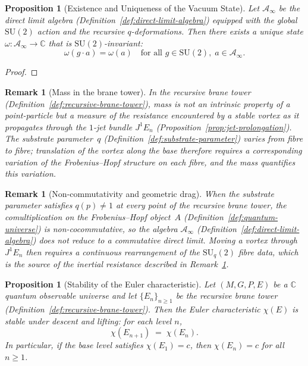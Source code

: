 \documentclass[12pt,a4paper]{report}
\newtheorem{proposition}[theorem]{Proposition}
\newtheorem{remark}[theorem]{Remark}
\begin{document}
\begin{proposition}[Existence and Uniqueness of the Vacuum State]
\label{prop:vacuum-state}
Let $\mathcal{A}_\infty$ be the direct limit algebra
(Definition~\ref{def:direct-limit-algebra}) equipped with the global
$\mathrm{SU}(2)$ action and the recursive $q$-deformations.  Then there exists
a unique state $\omega \colon \mathcal{A}_\infty \to \mathbb{C}$ that is
$\mathrm{SU}(2)$-invariant:
\[
  \omega(g \cdot a) = \omega(a)
  \quad\text{for all } g \in \mathrm{SU}(2),\;
  a \in \mathcal{A}_\infty.
\]
\end{proposition}

\begin{proof}
\end{proof}



\begin{remark}[Mass in the brane tower]
\label{rem:mass-geometric-drag}
In the recursive brane tower (Definition~\ref{def:recursive-brane-tower}),
mass is not an intrinsic property of a point-particle but a measure of the
resistance encountered by a stable vortex as it propagates through the
$1$-jet bundle $J^1 E_n$ (Proposition~\ref{prop:jet-prolongation}).  The
substrate parameter~$q$ (Definition~\ref{def:substrate-parameter}) varies from
fibre to fibre; translation of the vortex along the base therefore requires a
corresponding variation of the Frobenius--Hopf structure on each fibre, and
the mass quantifies this variation.
\end{remark}

\begin{remark}[Non-commutativity and geometric drag]
\label{rem:mass-noncommutative-drag}
When the substrate parameter satisfies $q(p) \neq 1$ at every point of the recursive brane tower, the comultiplication on the Frobenius--Hopf object~$A$
(Definition~\ref{def:quantum-universe}) is non-cocommutative, so the
algebra $\mathcal{A}_\infty$ (Definition~\ref{def:direct-limit-algebra})
does not reduce to a commutative direct limit.  Moving a vortex through
$J^1 E_n$ then requires a continuous rearrangement of the
$\mathrm{SU}_q(2)$ fibre data, which is the source of the inertial
resistance described in Remark~\ref{rem:mass-geometric-drag}.
\end{remark}

\begin{proposition}[Stability of the Euler characteristic]
\label{prop:euler-char-stability}
Let $(M, G, P, E)$ be a $\mathbb{C}$ quantum observable universe and let
$\{E_n\}_{n \geq 1}$ be the recursive brane tower
(Definition~\ref{def:recursive-brane-tower}).  Then the Euler characteristic
$\chi(E)$ is stable under descent and lifting: for each level $n$,
\[
  \chi(E_{n+1}) \;=\; \chi(E_n).
\]
In particular, if the base level satisfies $\chi(E_1) = c$, then
$\chi(E_n) = c$ for all $n \geq 1$.
\end{proposition}
\end{document}
